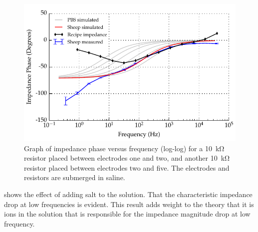 \begin{figure}
    \centering
    \includegraphics[width=\textwidth]{content/appendices/Solution-Impedance-Measurements/graphics/run14_calibration_10k_water_salt_amended_ZVsF_graph_phase}
    \caption{\label{fig:calibration_10kRes_saline_phase}Graph of impedance phase versus frequency (log-log) for a \SI{10}{\kilo\ohm} resistor placed between electrodes one and two, and another \SI{10}{\kilo\ohm} resistor placed between electrodes two and five. The electrodes and resistors are submerged in saline.}
\end{figure}

 shows the effect of adding salt to the solution.
That the characteristic impedance drop at low frequencies is evident.
This result adds weight to the theory that it is ions in the solution that is responsible for the impedance magnitude drop at low frequency.
